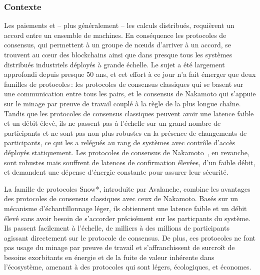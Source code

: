\documentclass[runningheads,francais,a4paper]{llncs}
\begin{document}
\subsubsection{Contexte}
Les paiements et -- plus généralement -- les calculs distribués, requièrent un accord entre un ensemble de machines. En
conséquence les protocoles de consensus, qui permettent à un groupe de nœuds d'arriver à un accord, se trouvent au cœur
des blockchains ainsi que dans presque tous les systèmes distribués industriels déployés à grande échelle. Le sujet a
été largement approfondi depuis presque 50 ans, et cet effort à ce jour n'a fait émerger que deux familles de
protocoles\,: les protocoles de consensus classiques qui se basent sur une communication entre tous les pairs, et le
consensus de Nakamoto qui s'appuie sur le minage par preuve de travail couplé à la règle de la plus longue chaîne.
Tandis que les protocoles de consensus classiques peuvent avoir une latence faible et un débit élevé, ils ne passent
pas à l'échelle sur un grand nombre de participants et ne sont pas non plus robustes en la présence de changements de
participants, ce qui les a relégués au rang de systèmes avec contrôle d'accès déployés statiquement. Les protocoles de
consensus de Nakamoto~\cite{nakamoto2008bitcoin,wood2014ethereum,EyalGSR16}, en revanche, sont robustes mais souffrent
de latences de confirmation élevées, d'un faible débit, et demandent une dépense d'énergie constante pour assurer leur
sécurité.

La famille de protocoles Snow*, introduite par Avalanche, combine les avantages des protocoles de consensus
classiques avec ceux de Nakamoto. Basés sur un mécanisme d'échantillonnage léger, ils obtiennent une
latence faible et un débit élevé sans avoir besoin de s'accorder précisément sur les particpants du système.
Ils passent facilement à l'échelle, de milliers à des millions de participants agissant directement sur le protocole de
consensus. De plus, ces protocoles ne font pas usage du minage par preuve de travail et s'affranchissent de surcroît
de besoins exorbitants en énergie et de la fuite de valeur inhérente dans l'écosystème, amenant à des protocoles qui
sont légers, écologiques, et économes. %
\end{document}
